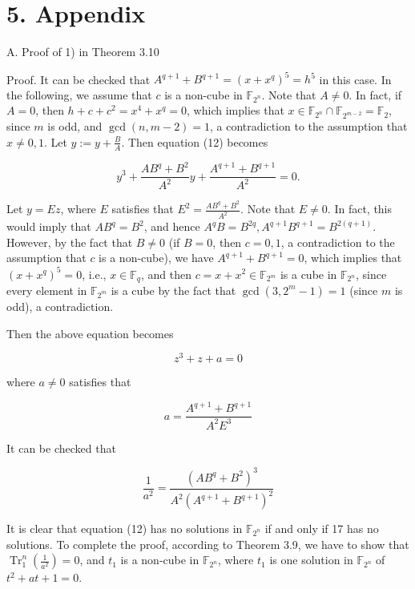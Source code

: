 \documentclass[10pt]{article}
\begin{document}
\section*{5. Appendix}
A. Proof of 1) in Theorem 3.10

Proof. It can be checked that $A^{q+1}+B^{q+1}=\left(x+x^{q}\right)^{5}=h^{5}$ in this case. In the following, we assume that $c$ is a non-cube in $\mathbb{F}_{2^{n}}$. Note that $A \neq 0$. In fact, if $A=0$, then $h+c+c^{2}=x^{4}+x^{q}=0$, which implies that $x \in \mathbb{F}_{2^{n}} \cap \mathbb{F}_{2^{m-2}}=\mathbb{F}_{2}$, since $m$ is odd, and $\operatorname{gcd}(n, m-2)=1$, a contradiction to the assumption that $x \neq 0,1$. Let $y:=y+\frac{B}{A}$. Then equation (12) becomes

$$
y^{3}+\frac{A B^{q}+B^{2}}{A^{2}} y+\frac{A^{q+1}+B^{q+1}}{A^{2}}=0 .
$$

Let $y=E z$, where $E$ satisfies that $E^{2}=\frac{A B^{q}+B^{2}}{A^{2}}$. Note that $E \neq 0$. In fact, this would imply that $A B^{q}=B^{2}$, and hence $A^{q} B=B^{2 q}, A^{q+1} B^{q+1}=B^{2(q+1)}$. However, by the fact that $B \neq 0$ (if $B=0$, then $c=0,1$, a contradiction to the assumption that $c$ is a non-cube), we have $A^{q+1}+B^{q+1}=0$, which implies that $\left(x+x^{q}\right)^{5}=0$, i.e., $x \in \mathbb{F}_{q}$, and then $c=x+x^{2} \in \mathbb{F}_{2^{m}}$ is a cube in $\mathbb{F}_{2^{n}}$, since every element in $\mathbb{F}_{2^{m}}$ is a cube by the fact that $\operatorname{gcd}\left(3,2^{m}-1\right)=1$ (since $m$ is odd), a contradiction.

Then the above equation becomes


\begin{equation*}
z^{3}+z+a=0 \tag{17}
\end{equation*}


where $a \neq 0$ satisfies that

$$
a=\frac{A^{q+1}+B^{q+1}}{A^{2} E^{3}}
$$

It can be checked that


\begin{equation*}
\frac{1}{a^{2}}=\frac{\left(A B^{q}+B^{2}\right)^{3}}{A^{2}\left(A^{q+1}+B^{q+1}\right)^{2}} \tag{18}
\end{equation*}


It is clear that equation (12) has no solutions in $\mathbb{F}_{2^{n}}$ if and only if 17 has no solutions. To complete the proof, according to Theorem 3.9, we have to show that $\operatorname{Tr}_{1}^{n}\left(\frac{1}{a^{2}}\right)=0$, and $t_{1}$ is a non-cube in $\mathbb{F}_{2^{n}}$, where $t_{1}$ is one solution in $\mathbb{F}_{2^{n}}$ of $t^{2}+a t+1=0$.
\end{document}
